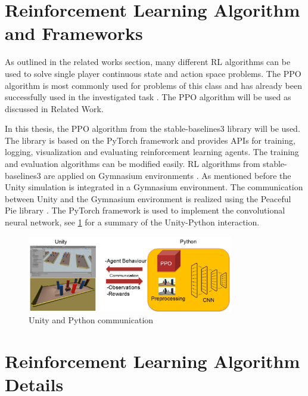 

\section{Reinforcement Learning Algorithm and Frameworks}

As outlined in the related works section, many different RL algorithms can be used to solve single player continuous state and action space problems. The PPO algorithm is most commonly used for problems of this class and has already been successfully used in the investigated task \autocite{maximilian}. The PPO algorithm will be used as discussed in Related Work.

In this thesis, the PPO algorithm from the stable-baselines3 library \autocite{sb3} will be used. The library is based on the PyTorch framework and provides APIs for training, logging, visualization and evaluating reinforcement learning agents. The training and evaluation algorithms can be modified easily. RL algorithms from stable-baselines3 are applied on Gymnasium environments \autocite{gymnasium}. As mentioned before the Unity simulation is integrated in a Gymnasium environment. The communication between Unity and the Gymnasium environment is realized using the Peaceful Pie library \autocite{peacefulpie}. The PyTorch framework is used to implement the convolutional neural network, see \ref{fig:unitycommunication} for a summary of the Unity-Python interaction.

\begin{figure}
     \centering
     \includegraphics[width=0.8\textwidth]{Bilder/unity_communication.png}
     \caption{Unity and Python communication}
     \label{fig:unitycommunication}
\end{figure}


\section{Reinforcement Learning Algorithm Details}


